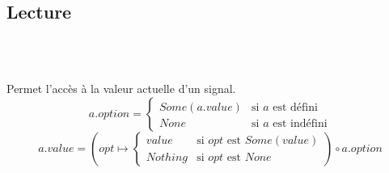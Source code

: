 	\subsection{Lecture}
	
		\begin{center}
			\\
			\\
		\end{center}
	
		Permet l'accès à la valeur actuelle d'un signal.
		\[
			a.option = \begin{cases}
				Some(a.value) & \text{si } a \text{ est défini}\\
				None & \text{si } a \text{ est indéfini}
			\end{cases}
		\]
		\[
			a.value = \left(opt \mapsto \begin{cases}
				value & \text{si } opt \text{ est } Some(value)\\
				Nothing & \text{si } opt \text{ est } None
			\end{cases}\right) \circ a.option
		\]
